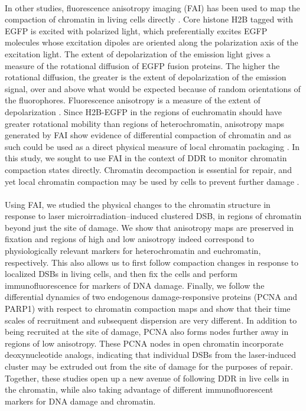 \paragraph*{} In other studies, fluorescence anisotropy imaging (FAI) has been used to map the compaction of chromatin in living cells directly \cite{banerjee2006chromatin}. Core histone H2B tagged with EGFP is excited with polarized light, which preferentially excites EGFP molecules whose excitation dipoles are oriented along the polarization axis of the excitation light. The extent of depolarization of the emission light gives a measure of the rotational diffusion of EGFP fusion proteins. The higher the rotational diffusion, the greater is the extent of depolarization of the emission signal, over and above what would be expected because of random orientations of the fluorophores. Fluorescence anisotropy is a measure of the extent of depolarization \cite{lakowicz2013principles,ghosh2012dynamic}. Since H2B-EGFP in the regions of euchromatin should have greater rotational mobility than regions of heterochromatin, anisotropy maps generated by FAI show evidence of differential compaction of chromatin and as such could be used as a direct physical measure of local chromatin packaging \cite{bhattacharya2009spatio}. In this study, we sought to use FAI in the context of DDR to monitor chromatin compaction states directly. Chromatin decompaction is essential for repair, and yet local chromatin compaction may be used by cells to prevent further damage \cite{BURGESS20141703}. 

\paragraph*{} Using FAI, we studied the physical changes to the chromatin structure in response to laser microirradiation–induced clustered DSB, in regions of chromatin beyond just the site of damage. We show that anisotropy maps are preserved in fixation and regions of high and low anisotropy indeed correspond to physiologically relevant markers for heterochromatin and euchromatin, respectively. This also allows us to first follow compaction changes in response to localized DSBs in living cells, and then fix the cells and perform immunofluorescence for markers of DNA damage. Finally, we follow the differential dynamics of two endogenous damage-responsive proteins (PCNA and PARP1) with respect to chromatin compaction maps and show that their time scales of recruitment and subsequent dispersion are very different. In addition to being recruited at the site of damage, PCNA also forms nodes further away in regions of low anisotropy. These PCNA nodes in open chromatin incorporate deoxynucleotide analogs, indicating that individual DSBs from the laser-induced cluster may be extruded out from the site of damage for the purposes of repair. Together, these studies open up a new avenue of following DDR in live cells in the chromatin, while also taking advantage of different immunofluorescent markers for DNA damage and chromatin.
